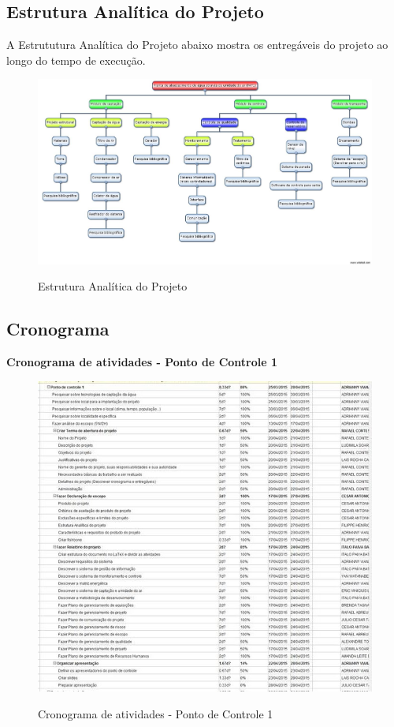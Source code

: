   \pagebreak
  \subsection{Estrutura Analítica do Projeto}
    
    A Estrututura Analítica do Projeto abaixo mostra os entregáveis do projeto ao longo do tempo de execução.
    
   \begin{figure}[!h]
    \centering
    \includegraphics[scale = 0.4, angle=90]{editaveis/figuras/EAP}
    \label{EAP}
    \caption{Estrutura Analítica do Projeto}
   \end{figure}
   \FloatBarrier
   
  \pagebreak
  \subsection{Cronograma}
   
   \textbf{Cronograma de atividades - Ponto de Controle 1}
   \begin{figure}[!h]
    \centering
    \includegraphics[scale = 0.8]{editaveis/figuras/cronogramaPC1}
    \label{Cronograma de atividades PC1}
    \caption{Cronograma de atividades - Ponto de Controle 1}
   \end{figure}
   \FloatBarrier
   
